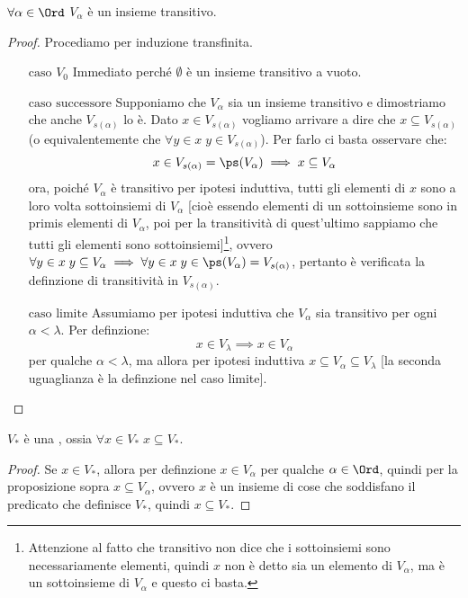 \documentclass[11pt]{scrartcl}
\begin{document}
\begin{lemma}
	$\forall \alpha \in \Ord$ $V_\alpha$ è un insieme transitivo.
\end{lemma}

\begin{proof}
	Procediamo per induzione transfinita.
	\begin{itemize}
		\item[$\boxed{\text{caso $V_0$}}$] Immediato perché $\emptyset$ è un insieme transitivo a vuoto.
		\item[$\boxed{\text{caso successore}}$] Supponiamo che $V_\alpha$ sia un insieme transitivo e dimostriamo che
		anche $V_{s(\alpha)}$ lo è. Dato $x \in V_{s(\alpha)}$ vogliamo arrivare a dire che $x \subseteq V_{s(\alpha)}$ (o equivalentemente
		che $\forall y \in x \; y \in V_{s(\alpha)}$). Per farlo ci basta osservare che:
		\[ x \in V_{s(\alpha)} = \ps(V_\alpha) \implies x \subseteq V_\alpha
			\]
		ora, poiché $V_\alpha$ è transitivo per ipotesi induttiva, tutti gli elementi di $x$ sono a loro volta sottoinsiemi di $V_\alpha$ [cioè essendo elementi di un sottoinsieme sono in primis elementi di $V_\alpha$, poi per la transitività
		di quest'ultimo sappiamo che tutti gli elementi sono sottoinsiemi]\footnote{Attenzione al fatto che transitivo non dice che i sottoinsiemi sono necessariamente elementi, quindi $x$ non è detto sia un elemento di $V_\alpha$, ma è un sottoinsieme
		di $V_\alpha$ e questo ci basta.}, ovvero $\forall y \in x \; y \subseteq V_\alpha \implies \forall y \in x \; y \in \ps(V_\alpha) = V_{s(\alpha)}$, pertanto è verificata la definzione di transitività in $V_{s(\alpha)}$.
		\item[$\boxed{\text{caso limite}}$] Assumiamo per ipotesi induttiva che $V_\alpha$ sia transitivo per ogni $\alpha < \lambda$. Per definzione:
		\[ x \in V_\lambda \implies x \in V_\alpha
			\]
		per qualche $\alpha < \lambda$, ma allora per ipotesi induttiva $x \subseteq V_\alpha \subseteq V_\lambda$ [la seconda uguaglianza è la definzione nel caso limite].
	\end{itemize}
\end{proof}

\begin{corollary}
	$V_*$ è una , ossia $\forall x \in V_* \; x \subseteq V_*$.
\end{corollary}

\begin{proof}
	Se $x \in V_*$, allora per definzione $x \in V_\alpha$ per qualche $\alpha \in \Ord$, quindi per la proposizione sopra $x \subseteq V_\alpha$, ovvero $x$ è un insieme di cose che soddisfano il predicato che definisce $V_*$, quindi $x \subseteq V_*$.
\end{proof}
\end{document}
